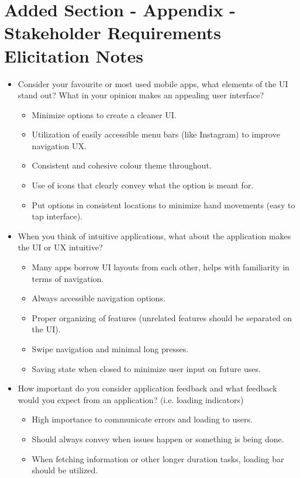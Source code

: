 \documentclass[12pt]{article}
\begin{document}
\section*{Added Section - Appendix - Stakeholder Requirements Elicitation Notes}

\begin{itemize}
  \item Consider your favourite or most used mobile apps, what elements of the UI
  stand out? What in your opinion makes an appealing user interface?
    \begin{itemize}
      \item Minimize options to create a cleaner UI.
      \item Utilization of easily accessible menu bars (like Instagram) to improve navigation UX.
      \item Consistent and cohesive colour theme throughout.
      \item Use of icons that clearly convey what the option is meant for.
      \item Put options in consistent locations to minimize hand movements (easy to tap interface).
    \end{itemize}
  \item When you think of intuitive applications, what about the application makes
  the UI or UX intuitive?
    \begin{itemize}
      \item Many apps borrow UI layouts from each other, helps with familiarity in terms of navigation.
      \item Always accessible navigation options.
      \item Proper organizing of features (unrelated features should be separated on the UI).
      \item Swipe navigation and minimal long presses.
      \item Saving state when closed to minimize user input on future uses.
    \end{itemize}
  \item How important do you consider application feedback and what feedback would you
  expect from an application? (i.e. loading indicators)
    \begin{itemize}
      \item High importance to communicate errors and loading to users.
      \item Should always convey when issues happen or something is being done.
      \item When fetching information or other longer duration tasks, loading bar should be utilized.

\end{itemize}
\end{itemize}
\end{document}
